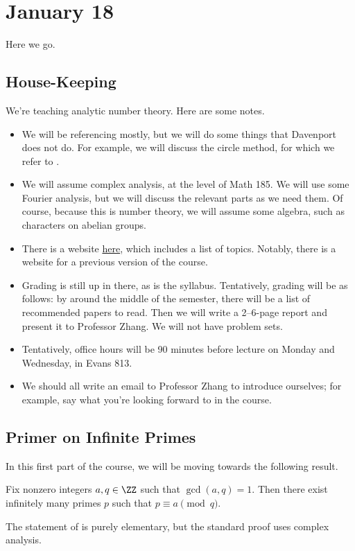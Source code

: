 \documentclass[../notes.tex]{subfiles}
\begin{document}
\section{January 18}

Here we go.

\subsection{House-Keeping}
We're teaching analytic number theory. Here are some notes.
\begin{itemize}
	\item We will be referencing \cite{davenport-mult-nt} mostly, but we will do some things that Davenport does not do. For example, we will discuss the circle method, for which we refer to \cite{davenport-ineqs}.
	\item We will assume complex analysis, at the level of Math 185. We will use some Fourier analysis, but we will discuss the relevant parts as we need them. Of course, because this is number theory, we will assume some algebra, such as characters on abelian groups.
	\item There is a website \href{https://sites.google.com/view/ruixiang-zhang/home/teaching/math191_spring2023}{here}, which includes a list of topics. Notably, there is a website for a previous version of the course.
	\item Grading is still up in there, as is the syllabus. Tentatively, grading will be as follows: by around the middle of the semester, there will be a list of recommended papers to read. Then we will write a 2--6-page report and present it to Professor Zhang. We will not have problem sets.
	\item Tentatively, office hours will be 90 minutes before lecture on Monday and Wednesday, in Evans 813.
	\item We should all write an email to Professor Zhang to introduce ourselves; for example, say what you're looking forward to in the course.
\end{itemize}

\subsection{Primer on Infinite Primes}
In this first part of the course, we will be moving towards the following result.
\begin{theorem}[Dirichlet] \label{thm:dirichlet}
	Fix nonzero integers $a,q\in\ZZ$ such that $\gcd(a,q)=1$. Then there exist infinitely many primes $p$ such that $p\equiv a\pmod q$.
\end{theorem}
The statement of  is purely elementary, but the standard proof uses complex analysis.
\end{document}
